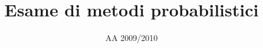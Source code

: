 \documentclass[a4paper,11pt]{article}
\begin{document}
\title{Esame di metodi probabilistici}
\date{AA 2009/2010}
\maketitle





\end{document}
